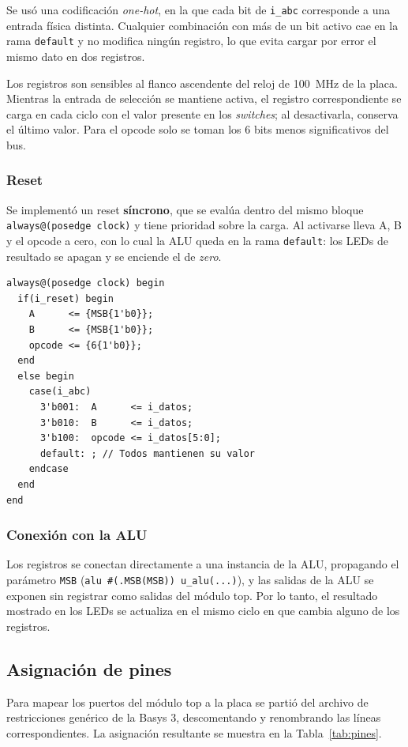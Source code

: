 Se usó una codificación \textit{one-hot}, en la que cada bit de \texttt{i\_abc} corresponde a una entrada física distinta. Cualquier combinación con más de un bit activo cae en la rama \texttt{default} y no modifica ningún registro, lo que evita cargar por error el mismo dato en dos registros.

Los registros son sensibles al flanco ascendente del reloj de 100~MHz de la placa. Mientras la entrada de selección se mantiene activa, el registro correspondiente se carga en cada ciclo con el valor presente en los \textit{switches}; al desactivarla, conserva el último valor. Para el opcode solo se toman los 6 bits menos significativos del bus.

\subsubsection{Reset}
Se implementó un reset \textbf{síncrono}, que se evalúa dentro del mismo bloque \texttt{always@(posedge clock)} y tiene prioridad sobre la carga. Al activarse lleva A, B y el opcode a cero, con lo cual la ALU queda en la rama \texttt{default}: los LEDs de resultado se apagan y se enciende el de \textit{zero}.

\begin{lstlisting}[caption={Lógica secuencial del módulo top.}]
always@(posedge clock) begin
  if(i_reset) begin
    A      <= {MSB{1'b0}};
    B      <= {MSB{1'b0}};
    opcode <= {6{1'b0}};
  end
  else begin
    case(i_abc)
      3'b001:  A      <= i_datos;
      3'b010:  B      <= i_datos;
      3'b100:  opcode <= i_datos[5:0];
      default: ; // Todos mantienen su valor
    endcase
  end
end
\end{lstlisting}

\subsubsection{Conexión con la ALU}
Los registros se conectan directamente a una instancia de la ALU, propagando el parámetro \texttt{MSB} (\texttt{alu \#(.MSB(MSB)) u\_alu(...)}), y las salidas de la ALU se exponen sin registrar como salidas del módulo top. Por lo tanto, el resultado mostrado en los LEDs se actualiza en el mismo ciclo en que cambia alguno de los registros.

\subsection{Asignación de pines}
Para mapear los puertos del módulo top a la placa se partió del archivo de restricciones genérico de la Basys 3, descomentando y renombrando las líneas correspondientes. La asignación resultante se muestra en la Tabla~\ref{tab:pines}.


